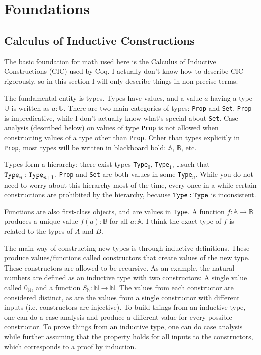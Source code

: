 \documentclass[../math.tex]{subfiles}
\begin{document}
\chapter{Foundations} \label{chap_foundations}

\section{Calculus of Inductive Constructions}

The basic foundation for math used here is the Calculus of Inductive
Constructions (CIC) used by Coq.  I actually don't know how to describe CIC
rigorously, so in this section I will only describe things in non-precise terms.

The fundamental entity is types.  Types have values, and a value $a$ having a
type $\mathbb U$ is written as $a : \mathbb U$.  There are two main categories
of types: \verb|Prop| and \verb|Set|.  \verb|Prop| is impredicative, while I
don't actually know what's special about \verb|Set|.  Case analysis (described
below) on values of type \verb|Prop| is not allowed when constructing values of
a type other than \verb|Prop|.  Other than types explicitly in \verb|Prop|, most
types will be written in blackboard bold: $\mathbb A$, $\mathbb B$, etc.

Types form a hierarchy: there exist types \verb|Type|$_0$, \verb|Type|$_1$,
\ldots such that $\verb|Type|_n : \verb|Type|_{n + 1}$.  \verb|Prop| and
\verb|Set| are both values in some \verb|Type|$_n$.  While you do not need to
worry about this hierarchy most of the time, every once in a while certain
constructions are prohibited by the hierarchy, because $\verb|Type| :
\verb|Type|$ is inconsistent.

Functions are also first-class objects, and are values in \verb|Type|.  A
function $f : \mathbb A \rightarrow \mathbb B$ produces a unique value $f(a) :
\mathbb B$ for all $a : \mathbb A$.  I think the exact type of $f$ is related to
the types of $A$ and $B$.

The main way of constructing new types is through inductive definitions.  These
produce values/functions called constructors that create values of the new type.
These constructors are allowed to be recursive.  As an example, the natural
numbers are defined as an inductive type with two constructors: A single value
called $0_{\mathbb N}$, and a function $S_{\mathbb N} : \mathbb N \rightarrow
\mathbb N$.  The values from each constructor are considered distinct, as are
the values from a single constructor with different inputs (i.e. constructors
are injective).  To build things from an inductive type, one can do a case
analysis and produce a different value for every possible constructor.  To prove
things from an inductive type, one can do case analysis while further assuming
that the property holds for all inputs to the constructors, which corresponds to
a proof by induction.
\end{document}
